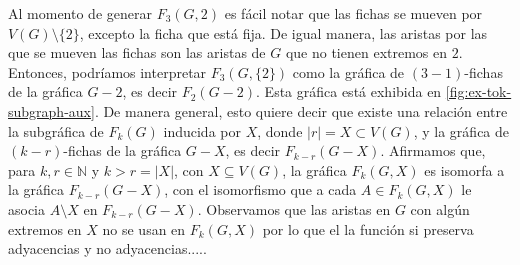 Al momento de generar $F_3(G,2)$ es f\'acil notar que las fichas se mueven
por $V(G) \setminus \{2\}$, excepto la ficha que est\'a fija. De igual manera,
las aristas por las que se mueven las fichas son las aristas de $G$ que no
tienen extremos en $2$. Entonces, podr\'iamos interpretar $F_3(G,\{2\})$ como la
gr\'afica de $(3-1)$-fichas de la gr\'afica $G-2$, es decir $F_2(G-2)$. Esta
gr\'afica est\'a exhibida en \cref{fig:ex-tok-subgraph-aux}. De manera general,
esto quiere decir que existe una relaci\'on entre la subgr\'afica de $F_k(G)$
inducida por $X$, donde $|r|=X \subset V(G)$, y la gr\'afica de $(k-r)$-fichas
de la gr\'afica $G-X$, es decir $F_{k-r}(G-X)$. Afirmamos que, para $k,r \in
\mathbb{N}$ y $k>r = |X|$, con $X \subseteq V(G)$, la gr\'afica $F_k(G,X)$ es
isomorfa a la gr\'afica $F_{k-r}(G-X)$, con el isomorfismo que a cada $A \in
F_k(G,X)$ le asocia $A \setminus X$ en $F_{k-r}(G-X)$.   Observamos que las
aristas en $G$ con alg\'un extremos en $X$ no se usan en $F_k(G,X)$ por lo que
el la funci\'on si preserva adyacencias y no adyacencias..... 

